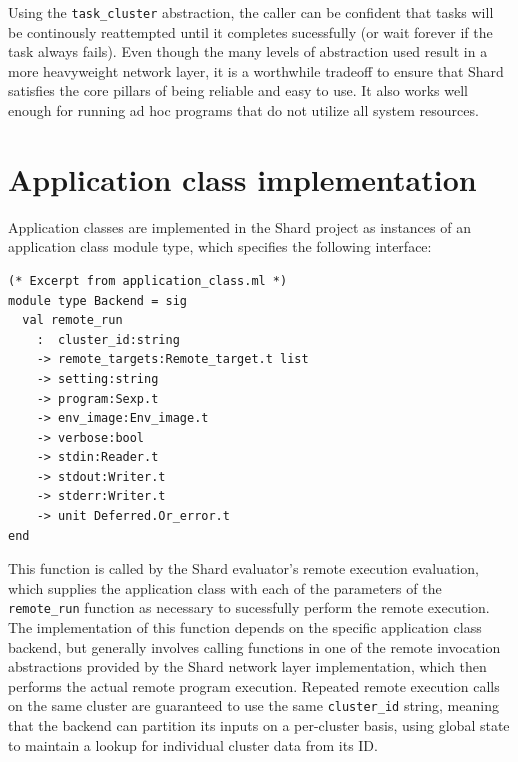 \documentclass[twoside]{report}
\begin{document}
Using the \texttt{task\_cluster} abstraction, the caller can be confident that tasks will be continously reattempted until it completes sucessfully (or wait forever if the task always fails).
Even though the many levels of abstraction used result in a more heavyweight network layer, it is a worthwhile tradeoff to ensure that Shard satisfies the core pillars of being reliable and easy to use. It also works well enough for running ad hoc programs that do not utilize all system resources.

\section{Application class implementation}


Application classes are implemented in the Shard project as instances of an application class module type, which specifies the following interface:

\begin{minipage}[c]{\textwidth-15pt}
  \begin{lstlisting}
(* Excerpt from application_class.ml *)
module type Backend = sig
  val remote_run
    :  cluster_id:string
    -> remote_targets:Remote_target.t list
    -> setting:string
    -> program:Sexp.t
    -> env_image:Env_image.t
    -> verbose:bool
    -> stdin:Reader.t
    -> stdout:Writer.t
    -> stderr:Writer.t
    -> unit Deferred.Or_error.t
end
\end{lstlisting}
  \smallskip
\end{minipage}

This function is called by the Shard evaluator's remote execution evaluation, which supplies the application class with each of the parameters of the \texttt{remote\_run} function as necessary to sucessfully perform the remote execution.
The implementation of this function depends on the specific application class backend, but generally involves calling functions in one of the remote invocation abstractions provided by the Shard network layer implementation, which then performs the actual remote program execution.
Repeated remote execution calls on the same cluster are guaranteed to use the same \texttt{cluster\_id} string, meaning that the backend can partition its inputs on a per-cluster basis, using global state to maintain a lookup for individual cluster data from its ID.
\end{document}

